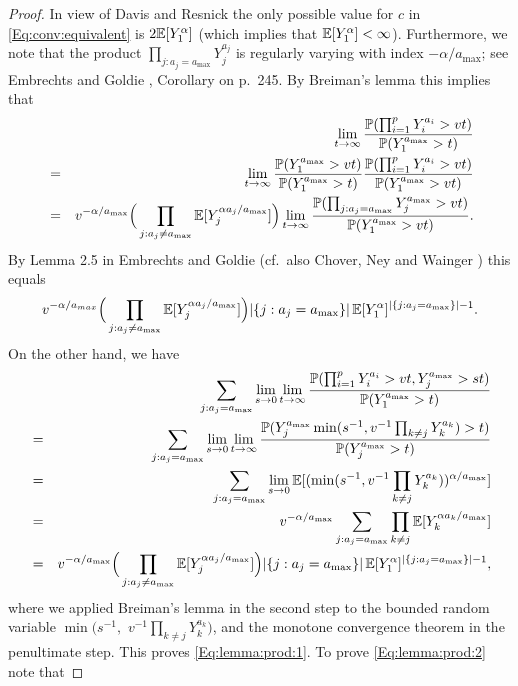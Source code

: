 \begin{proof} 
In view of Davis and Resnick \cite{davis:resnick:1986} the only possible value for $c$ in \eqref{Eq:conv:equivalent} is $2 {\mathbb E}[Y_1^\alpha]$ (which implies that ${\mathbb E}[Y_1^\alpha]<\infty$). Furthermore, we note that the product $\prod_{j:a_j=a_{\max}}Y_j^{a_j}$ is regularly varying with index $-\alpha/a_{\max}$; see Embrechts and Goldie \cite{embrechts:goldie:1980}, Corollary on p.~245. By Breiman's lemma this implies that
\begin{eqnarray*}
&& \lim_{t \to \infty} \frac{{\mathbb P}(\prod_{i=1}^p Y_i^{a_i}>vt)}{{\mathbb P}(Y_1^{a_{\max}}>t)}\\
&=& \lim_{t \to \infty} \frac{{\mathbb P}(Y_1^{a_{\max}}>vt)}{{\mathbb P}(Y_1^{a_{\max}}>t)}\frac{{\mathbb P}(\prod_{i=1}^p Y_i^{a_i}>vt)}{{\mathbb P}(Y_1^{a_{\max}}>vt)}\\
&=& v^{-\alpha/a_{\max}}  \Big( \prod_{j:a_j \neq a_{\max}} {\mathbb E}[Y_j^{\alpha a_j/a_{\max}}] \Big)\lim_{t \to \infty} \frac{{\mathbb P}(\prod_{j:a_j=a_{\max}} Y_j^{a_{\max}}>vt)}{{\mathbb P}(Y_1^{a_{\max}}>vt)}.
\end{eqnarray*}
By Lemma 2.5 in Embrechts and Goldie \cite{embrechts:goldie:1982} 
(cf.\ also  Chover, Ney and Wainger \cite{chover:ney:wainger:1973}) this equals 
$$ v^{-\alpha/a_{max}} \Big(\prod_{j:a_j\neq a_{\max}} {\mathbb E}[Y_j^{\alpha a_j/a_{\max}}] \Big) |\{j:a_j = a_{\max} \}|\,{\mathbb E}[Y_1^\alpha]^{ |\{j:a_j = a_{\max} \}|-1}. $$
On the other hand, we have
\begin{eqnarray*}
&& \sum_{j:a_j=a_{\max}} \lim_{s \to 0} \lim_{t \to \infty} \frac{{\mathbb P}(\prod_{i=1}^p Y_i^{a_i}>vt, Y_j^{a_{\max}}>st)}{{\mathbb P}(Y_1^{a_{\max}}>t)} \\
&=& \sum_{j:a_j=a_{\max}} \lim_{s \to 0} \lim_{t \to \infty} \frac{{\mathbb P}(Y_j^{a_{\max}}\min(s^{-1},v^{-1}\prod_{k\neq j}Y_k^{a_k})>t)}{{\mathbb P}(Y_j^{a_{\max}}>t)} \\
&=&  \sum_{j:a_j=a_{\max}} \lim_{s \to 0} {\mathbb E}[(\min(s^{-1},v^{-1}\prod_{k \neq j}Y_k^{a_k}))^{\alpha/a_{\max}}] \\
&=&  v^{-\alpha/a_{\max}} \sum_{j:a_j=a_{\max}} \prod_{k \neq j}{\mathbb E}[Y_k^{\alpha a_k/a_{\max}}] \\
&=& v^{-\alpha/a_{\max}}  \Big(\prod_{j:a_j\neq a_{\max}} {\mathbb E}[Y_j^{\alpha a_j/a_{\max}}] \Big)  |\{j: a_j=a_{\max}\}|\, {\mathbb E}[Y_1^\alpha]^{|\{j:a_j = a_{\max} \}|-1},
\end{eqnarray*}
where we applied Breiman's lemma in the second step to the bounded random variable $\min(s^{-1},$ $v^{-1}\prod_{k\neq j}Y_k^{a_k})$, and the monotone convergence theorem in the penultimate step. This proves \eqref{Eq:lemma:prod:1}. To prove \eqref{Eq:lemma:prod:2} note that 

\end{proof}
